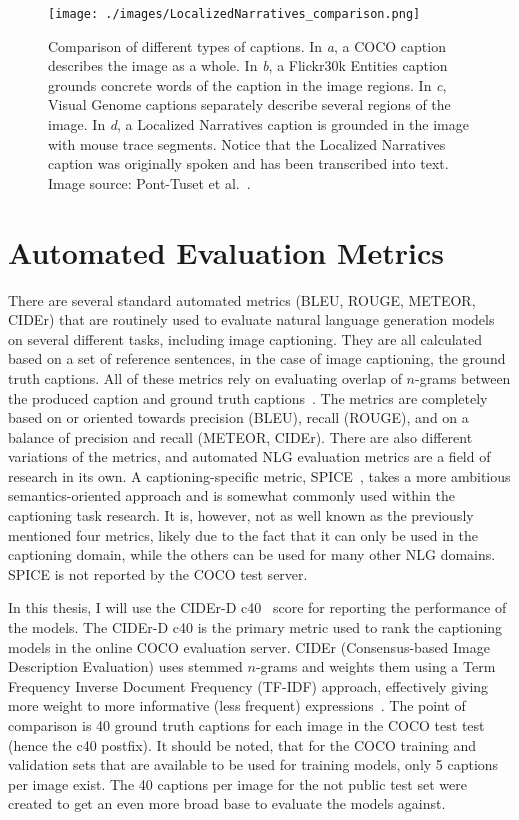 \documentclass[english,twoside,openright]{HYgraduMLDS}
\begin{document}
\begin{figure}[h] 
\centering
\texttt{[image: ./images/LocalizedNarratives\_comparison.png]}
\caption{Comparison of different types of captions. In \textit{a}, a COCO caption describes the image as a whole. In \textit{b}, a Flickr30k Entities caption grounds concrete words of the caption in the image regions. In \textit{c}, Visual Genome captions separately describe several regions of the image. In \textit{d}, a Localized Narratives caption is grounded in the image with mouse trace segments. Notice that the Localized Narratives caption was originally spoken and has been transcribed into text. Image source: Pont-Tuset et al.~\cite{LocalizedNarratives}.}
\label{fig:LocalizedNarratives_comparison}
\end{figure}

\section{Automated Evaluation Metrics}
There are several standard automated metrics (BLEU, ROUGE, METEOR, CIDEr) that are routinely used to evaluate natural language generation models on several different tasks, including image captioning. They are all calculated based on a set of reference sentences, in the case of image captioning, the ground truth captions. All of these metrics rely on evaluating overlap of $n$-grams between the produced caption and ground truth captions~\cite{SPICE}. The metrics are completely based on or oriented towards precision (BLEU), recall (ROUGE), and on a balance of precision and recall (METEOR, CIDEr). There are also different variations of the metrics, and automated NLG evaluation metrics are a field of research in its own. A captioning-specific metric, SPICE~\cite{SPICE}, takes a more ambitious semantics-oriented approach and is somewhat commonly used within the captioning task research. It is, however, not as well known as the previously mentioned four metrics, likely due to the fact that it can only be used in the captioning domain, while the others can be used for many other NLG domains. SPICE is not reported by the COCO test server. 

In this thesis, I will use the CIDEr-D c40~\cite{CIDEr} score for reporting the performance of the models. The CIDEr-D c40 is the primary metric used to rank the captioning models in the online COCO evaluation server. CIDEr (Consensus-based Image Description Evaluation) uses stemmed $n$-grams and weights them using a Term Frequency Inverse Document Frequency (TF-IDF) approach, effectively giving more weight to more informative (less frequent) expressions~\cite{CIDEr}. The point of comparison is 40 ground truth captions for each image in the COCO test test (hence the c40 postfix). It should be noted, that for the COCO training and validation sets that are available to be used for training models, only 5 captions per image exist. The 40 captions per image for the not public test set were created to get an even more broad base to evaluate the models against. 
\end{document}
